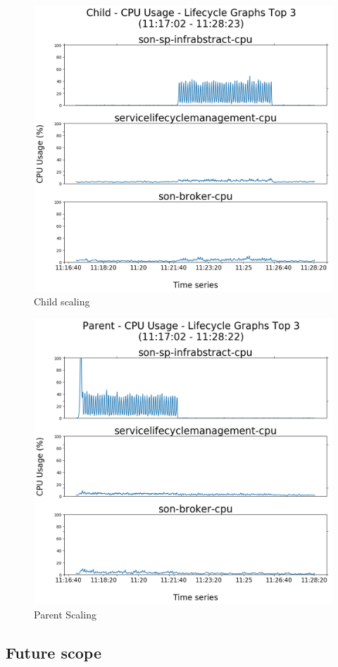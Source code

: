 \begin{figure}[h]
	\centering
	\includegraphics[width=0.7\linewidth]{figures/scalability_graphs/Scalability-Evaluation/Child-TOP-3-Lifecycle}
	\caption{Child scaling}
	\label{fig:child-top-3-lifecycle}
\end{figure}

\begin{figure}[h]
	\centering
	\includegraphics[width=0.7\linewidth]{figures/scalability_graphs/Scalability-Evaluation/Parent-TOP-3-Lifecycle}
	\caption{Parent Scaling}
	\label{fig:parent-top-3-lifecycle}
\end{figure}


\subsection{Future scope}